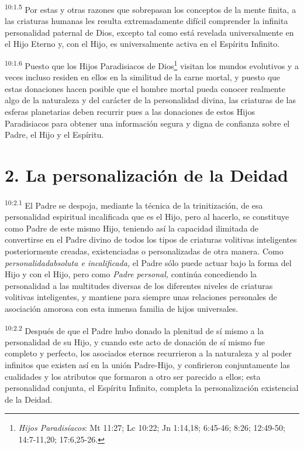 \par
\textsuperscript{10:1.5} Por estas y otras razones que sobrepasan los conceptos de la mente finita, a las criaturas humanas les resulta extremadamente difícil comprender la infinita personalidad paternal de Dios, excepto tal como está revelada universalmente en el Hijo Eterno y, con el Hijo, es universalmente activa en el Espíritu Infinito.

\par
\textsuperscript{10:1.6} Puesto que los Hijos Paradisiacos de Dios\footnote{\textit{Hijos Paradisíacos}: Mt 11:27; Lc 10:22; Jn 1:14,18; 6:45-46; 8:26; 12:49-50; 14:7-11,20; 17:6,25-26.} visitan los mundos evolutivos y a veces incluso residen en ellos en la similitud de la carne mortal, y puesto que estas donaciones hacen posible que el hombre mortal pueda conocer realmente algo de la naturaleza y del carácter de la personalidad divina, las criaturas de las esferas planetarias deben recurrir pues a las donaciones de estos Hijos Paradisiacos para obtener una información segura y digna de confianza sobre el Padre, el Hijo y el Espíritu.

\section*{2. La personalización de la Deidad}
\par
\textsuperscript{10:2.1} El Padre se despoja, mediante la técnica de la trinitización, de esa personalidad espiritual incalificada que es el Hijo, pero al hacerlo, se constituye como Padre de este mismo Hijo, teniendo así la capacidad ilimitada de convertirse en el Padre divino de todos los tipos de criaturas volitivas inteligentes posteriormente creadas, existenciadas o personalizadas de otra manera. Como \textit{personalidadabsoluta e incalificada,} el Padre sólo puede actuar bajo la forma del Hijo y con el Hijo, pero como \textit{Padre personal,} continúa concediendo la personalidad a las multitudes diversas de los diferentes niveles de criaturas volitivas inteligentes, y mantiene para siempre unas relaciones personales de asociación amorosa con esta inmensa familia de hijos universales.

\par
\textsuperscript{10:2.2} Después de que el Padre hubo donado la plenitud de sí mismo a la personalidad de su Hijo, y cuando este acto de donación de sí mismo fue completo y perfecto, los asociados eternos recurrieron a la naturaleza y al poder infinitos que existen así en la unión Padre-Hijo, y confirieron conjuntamente las cualidades y los atributos que formaron a otro ser parecido a ellos; esta personalidad conjunta, el Espíritu Infinito, completa la personalización existencial de la Deidad.


